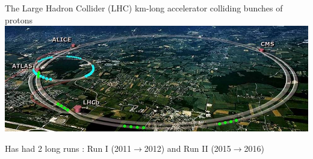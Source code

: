 \documentclass[10pt]{beamer}
\begin{document}
\begin{frame}{The Large Hadron Collider (LHC)}
 km-long accelerator colliding bunches of protons
\includegraphics[width=\linewidth]{figures/lhc-sim.jpg}
\vspace*{-1.5\baselineskip}
\begin{table}[!h]
\centering
\label{tab:lhcParas}
\end{table}
Has had 2 long runs : Run I (2011$\to$2012) and Run II (2015$\to$2016)
\end{frame}
\end{document}
